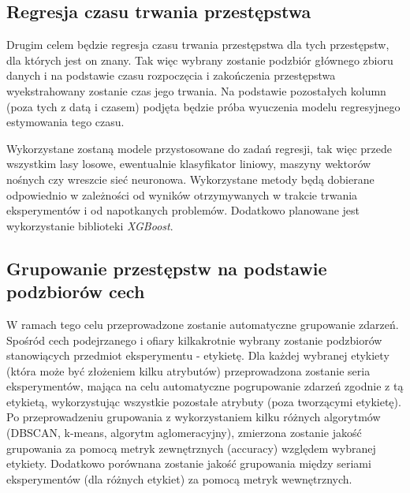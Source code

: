\documentclass{classrep}
\begin{document}
{        \subsection{Regresja czasu trwania przestępstwa}
        \label{project_goal_2} {
            Drugim celem będzie regresja czasu trwania przestępstwa dla tych przestępstw, dla których jest on znany. Tak więc wybrany zostanie podzbiór głównego zbioru danych i na podstawie czasu rozpoczęcia i zakończenia przestępstwa wyekstrahowany zostanie czas jego trwania. Na podstawie pozostałych kolumn (poza tych z datą i czasem) podjęta będzie próba wyuczenia modelu regresyjnego estymowania tego czasu.
        
            Wykorzystane zostaną modele przystosowane do zadań regresji, tak więc przede wszystkim lasy losowe, ewentualnie klasyfikator liniowy, maszyny wektorów nośnych czy wreszcie sieć neuronowa. Wykorzystane metody będą dobierane odpowiednio w zależności od wyników otrzymywanych w trakcie trwania eksperymentów i od napotkanych problemów. Dodatkowo planowane jest wykorzystanie biblioteki \emph{XGBoost}.
        }

        \subsection{Grupowanie przestępstw na podstawie podzbiorów cech}
        \label{project_goal_3} {
            W ramach tego celu przeprowadzone zostanie automatyczne grupowanie zdarzeń.
            Spośród cech podejrzanego i ofiary kilkakrotnie wybrany zostanie podzbiorów
            stanowiących przedmiot eksperymentu - etykietę. Dla każdej wybranej
            etykiety (która może być złożeniem kilku atrybutów) przeprowadzona zostanie
            seria eksperymentów, mająca na celu automatyczne pogrupowanie zdarzeń
            zgodnie z tą etykietą, wykorzystując wszystkie pozostałe atrybuty (poza
            tworzącymi etykietę). Po przeprowadzeniu grupowania z wykorzystaniem kilku
            różnych algorytmów (DBSCAN, k-means, algorytm aglomeracyjny), zmierzona
            zostanie jakość grupowania za pomocą metryk zewnętrznych (accuracy)
            względem wybranej etykiety. Dodatkowo porównana zostanie jakość grupowania
            między seriami eksperymentów (dla różnych etykiet) za pomocą metryk
            wewnętrznych.
        }

    }
\end{document}
